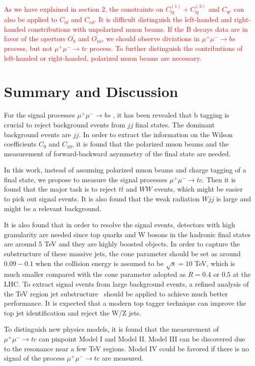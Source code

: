 \documentclass[a4paper,11pt]{article}
\begin{document}
\textcolor{red}{
As we have explained in section 2, 
the constraints on $C^{(1)}_{lq}+C^{(3)}_{lq}$ and $C_{qe}$ can also be applied to $C_{ld}$ and $C_{ed}$.  
It is difficult distinguish the left-handed and right-handed constributions with unpolarized muon beams.
If the B decays data are in favor of the opertors $O^{\prime}_{9}$ and $O^{\prime}_{10}$, 
we should observe diviations in $\mu^+\mu^-\to bs$ process, 
but not $\mu^+\mu^-\to tc$ process. 
To further distinguish the contributions of left-handed or right-handed, 
polarized muon beams are necessary. 
}

\section{Summary and Discussion}\label{Sec:conc}
For the signal processes $\mu^+ \mu^- \to b s$ \cite{Altmannshofer:2022xri}, it has been revealed that b tagging is crucial to reject background events from $jj$ final states. The dominant background events are $j j$. In order to extract the information on the Wilson coefficients $C_{9}$ and $C_{10}$, it is found that the polarized muon beams and the measurement of forward-backward asymmetry of the final state are needed. 

In this work, instead of assuming polarized muon beams and charge tagging of a final state, we propose to measure the signal processes $\mu^+ \mu^- \to t c$. Then it is found that the major task is to reject $t \bar{t}$ and $ W W$ events, which might be easier to pick out signal events. It is also found that the weak radiation $W j j $ is large and might be a relevant background.

It is also found that in order to resolve the signal events, 
detectors with high granularity are needed since top quarks and W bosons in the hadronic final states are around 5 TeV and they are highly boosted objects. 
In order to capture the substructure of these massive jets, 
the cone parameter should be set as around  $0.09-0.1$ when the collision energy is assumed to be $\sqrt{s}=10$ TeV, 
which is much smaller compared with the cone parameter adopted as $R=0.4$ or $0.5$ at the LHC. 
To extract signal events from large background events, 
a refined analysis of the TeV region jet substructure~\cite{Butterworth:2008iy,Kaplan:2008ie,Kilian:2021whd} should be applied to achieve much better performance. 
It is expected that a modern top tagger technique can improve the top jet identification and reject the W/Z jets.


To distinguish new physics models, it is found that the measurement of  $\mu^+ \mu^- \to tc$ can pinpoint Model I and Model II. Model III can be discovered due to the resonance near a few TeV regions. Model IV could be favored if there is no signal of the process $\mu^+ \mu^- \to t c$ are measured.
\end{document}
